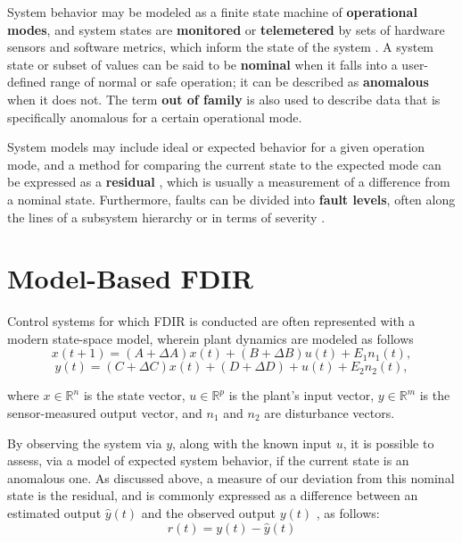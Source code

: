 System behavior may be modeled as a finite state machine of \textbf{operational modes}, and system states are \textbf{monitored} or \textbf{telemetered} by sets of hardware sensors and software metrics, which inform the state of the system \cite{dearden2004real}. A system state or subset of values can be said to be \textbf{nominal} when it falls into a user-defined range of normal or safe operation; it can be described as \textbf{anomalous} when it does not. The term \textbf{out of family} is also used to describe data that is specifically anomalous for a certain operational mode.

System models may include ideal or expected behavior for a given operation mode, and a method for comparing the current state to the expected mode can be expressed as a \textbf{residual} \cite{hwang2010survey}, which is usually a measurement of a difference from a nominal state. Furthermore, faults can be divided into \textbf{fault levels}, often along the lines of a subsystem hierarchy or in terms of severity \cite{tipaldi2014spacecraft}.

\section{Model-Based FDIR}

Control systems for which FDIR is conducted are often represented with a modern state-space model, wherein plant dynamics are modeled as follows \cite{hwang2010survey}
\begin{equation} \label{eq:plant_model1}
    x(t+1) = (A + \Delta A) x(t) + (B + \Delta B)u(t) + E_{1}n_{1}(t),
\end{equation}
\begin{equation} \label{eq:plant_model2}
    y(t) = (C + \Delta C) x(t) + (D + \Delta D) + u(t) + E_{2}n_{2}(t),
\end{equation}

where $x \in \mathbb{R}^{n}$ is the state vector, $u \in \mathbb{R}^{p}$ is the plant's input vector, $y \in \mathbb{R}^{m}$ is the sensor-measured output vector, and $n_{1}$ and $n_{2}$ are disturbance vectors.

By observing the system via $y$, along with the known input $u$, it is possible to assess, via a model of expected system behavior, if the current state is an anomalous one. As discussed above, a measure of our deviation from this nominal state is the residual, and is commonly expressed as a difference between an estimated output $\hat{y}(t)$ and the observed output $y(t)$ \cite{hwang2010survey}, as follows:
\begin{equation} \label{eq:residual_generation}
r(t) = y(t) - \hat{y}(t)
\end{equation}

